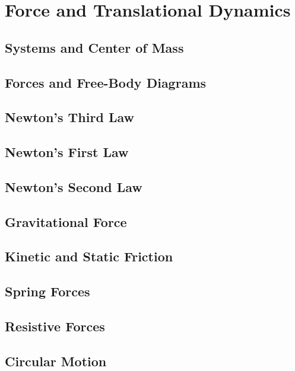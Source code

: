 \documentclass[../mech.tex]{subfiles}
\begin{document}
\chapter{Force and Translational Dynamics}
\section{Systems and Center of Mass}
\section{Forces and Free-Body Diagrams}
\section{Newton's Third Law}
\section{Newton's First Law}
\section{Newton's Second Law}
\section{Gravitational Force}
\section{Kinetic and Static Friction}
\section{Spring Forces}
\section{Resistive Forces}
\section{Circular Motion}
\end{document}
